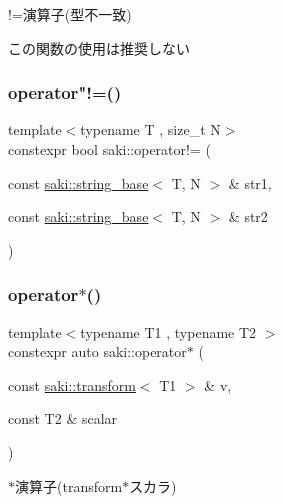 !=演算子(型不一致) 

この関数の使用は推奨しない \mbox{\label{namespacesaki_a97d9fc5d2082989be021e821379631d0}} 
\subsubsection{\texorpdfstring{operator"!=()}{operator!=()}\hspace{0.1cm}{\footnotesize\ttfamily [14/14]}}
{\footnotesize\ttfamily template$<$typename T , size\+\_\+t N$>$ \\
constexpr bool saki\+::operator!= (\begin{DoxyParamCaption}\item[{const \mbox{\hyperlink{classsaki_1_1string__base}{saki\+::string\+\_\+base}}$<$ T, N $>$ \&}]{str1,  }\item[{const \mbox{\hyperlink{classsaki_1_1string__base}{saki\+::string\+\_\+base}}$<$ T, N $>$ \&}]{str2 }\end{DoxyParamCaption})}

\mbox{\label{namespacesaki_ab9612151e27555ea59013c6a7da3322d}} 
\subsubsection{\texorpdfstring{operator$\ast$()}{operator*()}\hspace{0.1cm}{\footnotesize\ttfamily [1/14]}}
{\footnotesize\ttfamily template$<$typename T1 , typename T2 $>$ \\
constexpr auto saki\+::operator$\ast$ (\begin{DoxyParamCaption}\item[{const \mbox{\hyperlink{classsaki_1_1transform}{saki\+::transform}}$<$ T1 $>$ \&}]{v,  }\item[{const T2 \&}]{scalar }\end{DoxyParamCaption})}



$\ast$演算子(transform$\ast$スカラ) 

\mbox{\label{namespacesaki_a0fe5418c09468a2435c0a8a85a941174}} 
